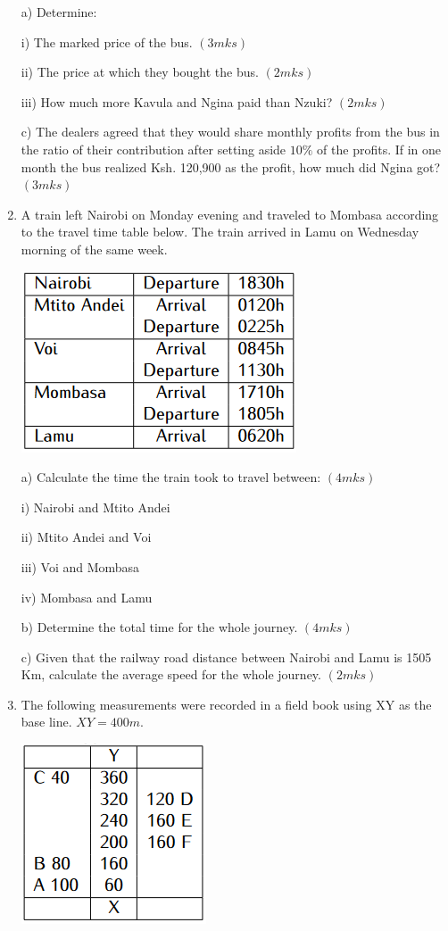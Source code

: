 \documentclass[
  a4paperpaper,
]{scrbook}
\begin{document}
\begin{tcolorbox}
\begin{enumerate}
  a) Determine:

  i) The marked price of the bus. \((3mks)\)

  ii) The price at which they bought the bus. \((2mks)\)

  iii) How much more Kavula and Ngina paid than Nzuki? \((2mks)\)

  c) The dealers agreed that they would share monthly profits from the
  bus in the ratio of their contribution after setting aside \(10\%\) of
  the profits. If in one month the bus realized Ksh. 120,900 as the
  profit, how much did Ngina got? \((3mks)\)
\item
  A train left Nairobi on Monday evening and traveled to Mombasa
  according to the travel time table below. The train arrived in Lamu on
  Wednesday morning of the same week.

  \includegraphics{figures/Md4_Q18.png}

  a) Calculate the time the train took to travel between: \((4mks)\)

  i) Nairobi and Mtito Andei

  ii) Mtito Andei and Voi

  iii) Voi and Mombasa

  iv) Mombasa and Lamu

  b) Determine the total time for the whole journey. \((4mks)\)

  c) Given that the railway road distance between Nairobi and Lamu is
  1505 Km, calculate the average speed for the whole journey. \((2mks)\)
\item
  The following measurements were recorded in a field book using XY as
  the base line. \(XY = 400m\).

  \includegraphics{figures/Md4_Q19.png}


\end{enumerate}
\end{tcolorbox}
\end{document}
